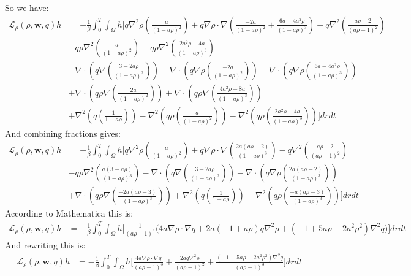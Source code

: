\documentclass[11pt, a4paper]{article}
\theoremstyle{definition}
\newcommand{\w}{\mathbf{w}}
\begin{document}
So we have:
\begin{align*}
	\mathcal{L}_\rho(\rho,\w,q)h &= -\frac{1}{\beta}\int_0^T\int_\Omega h \bigg[  q\nabla^2 \rho \left(\frac{a}{(1- a\rho)^2}\right)  + q \nabla \rho \cdot \nabla \left(\frac{-2a }{(1-a\rho)^2}+ \frac{6a-4a^2  \rho}{(1-a\rho)^3}  \right) - q \nabla^2 \left(\frac{a\rho -2}{(a\rho -1)^2}\right)\\
	&- q\rho  \nabla^2  \left(\frac{a }{(1-a\rho)^2} \right) - q\rho  \nabla^2  \left(\frac{2a^2\rho -4a}{(1-a\rho)^3} \right)\\
	& -\nabla \cdot \left( q  \nabla \left( \frac{3-2a\rho}{(1-a\rho)^2} \right) \right) - \nabla \cdot \left( q \nabla \rho  \left( \frac{-2a }{(1-a\rho)^2} \right)\right)  - \nabla \cdot \left( q \nabla \rho  \left(\frac{6a-4a^2  \rho}{(1-a\rho)^3}  \right)\right)  \\
	& + \nabla \cdot\left( q\rho \nabla \left(\frac{2a }{(1-a\rho)^2} \right) \right) + \nabla \cdot\left( q\rho \nabla \left( \frac{4a^2\rho -8a}{(1-a\rho)^3} \right) \right)\\
	&+   \nabla^2 \left(q \left(\frac{1}{1- a\rho} \right) \right) - \nabla^2 \left(q\rho  \left(\frac{a }{(1-a\rho)^2}\right)\right) - \nabla^2 \left(q\rho \left(\frac{2a^2\rho -4a}{(1-a\rho)^3} \right)\right)\bigg] dr dt 
\end{align*}
And combining fractions gives:
\begin{align*}
	\mathcal{L}_\rho(\rho,\w,q)h &= -\frac{1}{\beta}\int_0^T\int_\Omega h \bigg[  q\nabla^2 \rho \left(\frac{a}{(1- a\rho)^2}\right)  + q \nabla \rho \cdot \nabla \left(\frac{2a(a \rho -2)}{(1-a\rho)^3} \right) - q \nabla^2 \left(\frac{a\rho -2}{(a\rho -1)^2}\right)\\
	& - q\rho  \nabla^2  \left(\frac{a(3  - a \rho)}{(1-a\rho)^3} \right) -\nabla \cdot \left( q  \nabla \left( \frac{3-2a\rho}{(1-a\rho)^2} \right) \right)  - \nabla \cdot \left( q \nabla \rho  \left(\frac{2a(a \rho -2)}{(1-a\rho)^3}  \right)\right)  \\
	&  + \nabla \cdot\left( q\rho \nabla \left( \frac{-2a(a \rho- 3)}{(1-a\rho)^3} \right) \right)+   \nabla^2 \left(q \left(\frac{1}{1- a\rho} \right) \right) - \nabla^2 \left(q\rho \left(\frac{-a(a \rho -3)}{(1-a\rho)^3} \right)\right)\bigg] dr dt 
\end{align*}
According to Mathematica this is:
\begin{align*}
	\mathcal{L}_\rho(\rho,\w,q)h &= -\frac{1}{\beta}\int_0^T\int_\Omega h \bigg[ 
	\frac{1}{(a \rho -1)^3}\bigg(4 a \nabla \rho \cdot \nabla q + 
	2 a (-1 + a \rho) q \nabla^2 \rho + (-1 + 5 a \rho - 2 a^2 \rho^2) \nabla^2 q\bigg)
	\bigg] dr dt
\end{align*}
And rewriting this is:
\begin{align*}
\mathcal{L}_\rho(\rho,\w,q)h & = -\frac{1}{\beta}\int_0^T\int_\Omega h \bigg[ 
\frac{4 a \nabla \rho \cdot \nabla q}{(a \rho -1)^3}  +   \frac{2 a  q \nabla^2 \rho}{(a \rho -1)^2}  +   \frac{(-1 + 5 a \rho - 2 a^2 \rho^2) \nabla^2 q}{(a \rho -1)^3}
\bigg] dr dt
\end{align*}
\end{document}
